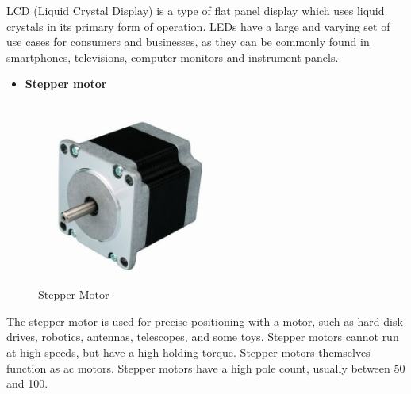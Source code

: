  LCD (Liquid Crystal Display) is a type of flat panel display which uses liquid crystals in its primary form of operation. LEDs have a large and varying set of use cases for consumers and businesses, as they can be commonly found in smartphones, televisions, computer monitors and instrument panels.
 
 
 \begin{itemize}
 	\item \Large\textbf {Stepper motor}
 \end{itemize}
 
	\begin{figure}[h]
		\centering
	\includegraphics[width=60mm,scale=1]{47}
	\caption{Stepper Motor}
	\label{Stepper Motor}
	
\end{figure}

 The stepper motor is used for precise positioning with a motor, such as hard disk drives, robotics, antennas, telescopes, and some toys. Stepper motors cannot run at high speeds, but have a high holding torque. Stepper motors themselves function as ac motors. Stepper motors have a high pole count, usually between 50 and 100.
 
\newpage
